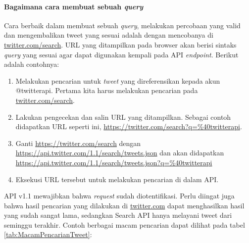 \paragraph{Bagaimana cara membuat sebuah \textit{query}}
Cara berbaik dalam membuat sebuah \textit{query}, melakukan percobaan yang valid dan mengembalikan tweet yang sesuai adalah dengan mencobanya di \url{twitter.com/search}. URL yang ditampilkan pada browser akan berisi sintaks \textit{query} yang sesuai agar dapat digunakan kempali pada API \textit{endpoint}. Berikut adalah contohnya:

\begin{enumerate}
	\item Melakukan pencarian untuk \textit{tweet} yang direferensikan kepada akun @twitterapi. Pertama kita harus melakukan pencarian pada \url{twitter.com/search}.
	\item Lakukan pengecekan dan salin URL yang ditampilkan. Sebagai contoh didapatkan URL seperti ini, \url{https://twitter.com/search?q=\%40twitterapi}.
	\item Ganti \url{https://twitter.com/search} dengan \url{https://api.twitter.com/1.1/search/tweets.json} dan akan didapatkan \url{https://api.twitter.com/1.1/search/tweets.json?q=\%40twitterapi}
	\item Eksekusi URL tersebut untuk melakukan pencarian di dalam API.
\end{enumerate}

API v1.1 mewajibkan bahwa \textit{request} sudah diotentifikasi. Perlu diingat juga bahwa hasil pencarian yang dilakukan di \url{twitter.com} dapat menghasilkan hasil yang sudah sangat lama, sedangkan Search API hanya melayani tweet dari seminggu terakhir. Contoh berbagai macam pencarian dapat dilihat pada tabel \ref{tab:MacamPencarianTweet}:

